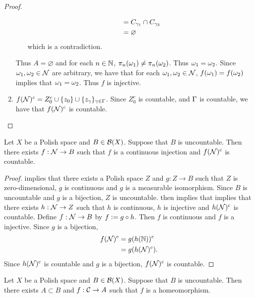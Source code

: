 \documentclass{book}
\begin{document}
\begin{proof}
\begin{enumerate}
\begin{itemize}
\begin{align*}
					& = C_{\gamma_1} \cap C_{\gamma_2} \\
					& = \varnothing
				\end{align*}
				which is a contradiction.
			\end{itemize}
			Thus $A = \varnothing$ and for each $n \in \mathbb{N}$, $\pi_n(\omega_1) \neq \pi_n(\omega_2)$. Thus $\omega_1 = \omega_2$. Since $\omega_1, \omega_2 \in \mathcal{N}$ are arbitrary, we have that for each $\omega_1, \omega_2 \in \mathcal{N}$, $f(\omega_1) = f(\omega_2)$ implies that $\omega_1 = \omega_2$. Thus $f$ is injective. 
			\item $f(\mathcal{N})^c = Z_0^c \cup \{z_0\} \cup \{z_{\gamma}\}_{\gamma \in \Gamma}$. Since $Z_0^c$ is countable, and $\Gamma$ is countable, we have that $f(\mathcal{N})^c$ is countable.
		\end{enumerate}
	\end{proof}
	
	
	
	

	
	
	\begin{ex} 
		Let $X$ be a Polish space and $B \in \mathcal{B}(X)$. Suppose that $B$ is uncountable. Then there exists $f: \mathcal{N} \rightarrow B$ such that $f$ is a continuous injection and $f(\mathcal{N})^c$ is countable.
	\end{ex}

	\begin{proof}
		 implies that there exists a Polish space $Z$ and $g:Z \rightarrow B$ such that $Z$ is zero-dimensional, $g$ is continuous and $g$ is a measurable isomorphism. Since $B$ is uncountable and $g$ is a bijection, $Z$ is uncountable.  then implies that implies that there exists $h:\mathcal{N} \rightarrow Z$ such that $h$ is continuous, $h$ is injective and $h(\mathcal{N})^c$ is countable. Define $f: \mathcal{N} \rightarrow B$ by $f \vcentcolon= g \circ h$. Then $f$ is continuous and $f$ is a injective. Since $g$ is a bijection,
		\begin{align*}
			f(\mathcal{N})^c
			& = g (h(\mathbb{N}))^c \\
			& = g(h(\mathcal{N})^c).
		\end{align*} 
		Since $h(\mathcal{N})^c$ is countable and $g$ is a bijection, $f(\mathcal{N})^c$ is countable.
	\end{proof}
	
	
	\begin{ex} 
		Let $X$ be a Polish space and $B \in \mathcal{B}(X)$. Suppose that $B$ is uncountable. Then there exists $A \subset B$ and $f: \mathcal{C} \rightarrow A$ such that $f$ is a homeomorphism. 
	\end{ex}
	
\end{document}
